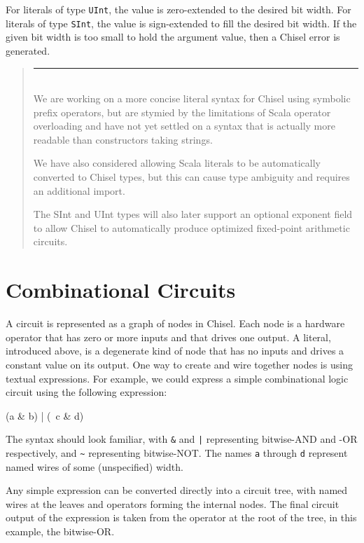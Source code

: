 \documentclass[twocolumn,10pt]{article}
\newenvironment{commentary}
{ \vspace{-0.1in}
  \begin{quotation}
  \noindent
  \small \em
  \rule{\linewidth}{1pt}\\
}
{
  \end{quotation}
}
\def\code#1{{\tt #1}}
\begin{document}
\noindent
For literals of type \code{UInt}, the value is
zero-extended to the desired bit width.  For literals of type
\code{SInt}, the value is sign-extended to fill the desired bit width.
If the given bit width is too small to hold the argument value, then a
Chisel error is generated.

\begin{commentary}
We are working on a more concise literal syntax for Chisel using
symbolic prefix operators, but are stymied by the limitations of Scala
operator overloading and have not yet settled on a syntax that is
actually more readable than constructors taking strings.

We have also considered allowing Scala literals to be automatically
converted to Chisel types, but this can cause type ambiguity and
requires an additional import.

The SInt and UInt types will also later support an optional exponent
field to allow Chisel to automatically produce optimized fixed-point
arithmetic circuits.
\end{commentary}

\section{Combinational Circuits}

A circuit is represented as a graph of nodes in Chisel.  Each node is
a hardware operator that has zero or more inputs and that drives one
output.  A literal, introduced above, is a degenerate kind of node
that has no inputs and drives a constant value on its output.  One way
to create and wire together nodes is using textual expressions.  For
example, we could express a simple combinational logic circuit
using the following expression:

\begin{scala}
(a & b) | (~c & d)
\end{scala}

The syntax should look familiar, with \code{\&} and \code{|}
representing bitwise-AND and -OR respectively, and \code{\~{}}
representing bitwise-NOT.  The names \code{a} through \code{d}
represent named wires of some (unspecified) width.

Any simple expression can be converted directly into a circuit tree,
with named wires at the leaves and operators forming the internal
nodes.  The final circuit output of the expression is taken from the
operator at the root of the tree, in this example, the bitwise-OR.
\end{document}
